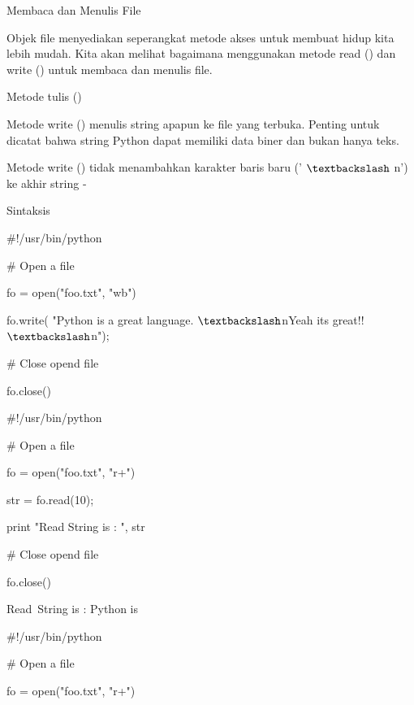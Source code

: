 \vspace{12pt}
Membaca dan Menulis File \par
\vspace{12pt}
Objek file menyediakan seperangkat metode akses untuk membuat hidup kita lebih mudah. Kita akan melihat bagaimana menggunakan metode read () dan write () untuk membaca dan menulis file. \par
Metode tulis () \par
\vspace{12pt}
Metode write () menulis string apapun ke file yang terbuka. Penting untuk dicatat bahwa string Python dapat memiliki data biner dan bukan hanya teks. \par
\vspace{12pt}
Metode write () tidak menambahkan karakter baris baru (' $  \textbackslash  $ n') ke akhir string - \par
Sintaksis \par
\vspace{12pt}
 $  \#  $!/usr/bin/python \par
\vspace{12pt}
 $  \#  $ Open a file \par
fo = open("foo.txt", "wb") \par
fo.write( "Python is a great language. $  \textbackslash  $nYeah its great!! $  \textbackslash  $n"); \par
\vspace{12pt}
 $  \#  $ Close opend file \par
fo.close() \par
 $  \#  $!/usr/bin/python \par
\vspace{12pt}
 $  \#  $ Open a file \par
fo = open("foo.txt", "r+") \par
str = fo.read(10); \par
print "Read String is : ", str \par
\vspace{12pt}
 $  \#  $ Close opend file \par
fo.close() \par
\vspace{12pt}
Read~String is :  Python is \par
\vspace{12pt}
 $  \#  $!/usr/bin/python \par
\vspace{12pt}
 $  \#  $ Open a file \par
fo = open("foo.txt", "r+") \par
